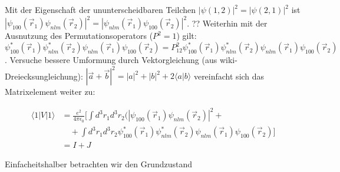 Mit der Eigenschaft der ununterscheidbaren Teilchen \(|\psi(1,2)|^2 = |\psi(2,1)|^2 \) ist \(|\psi_{100}(\vec r_1)\psi_{nlm}(\vec r_2)|^2 =|\psi_{nlm}(\vec r_1) \psi_{100}(\vec r_2)|^2 \). ?? Weiterhin mit der Ausnutzung des Permutationsoperators (\(P^2=1\)) gilt: \(\psi_{100}^*(\vec r_1)\psi_{nlm}^*(\vec r_2) \psi_{nlm}(\vec r_1) \psi_{100}(\vec r_2) = P_{12}^2  \psi_{100}^*(\vec r_1)\psi_{nlm}^*(\vec r_2) \psi_{nlm}(\vec r_1) \psi_{100}(\vec r_2)\). Versuche bessere Umformung durch Vektorgleichung (aus wiki-Dreiecksungleichung): \( |\vec a + \vec b|^2=|a|^2+|b|^2+2\langle a|b\rangle   \)  vereinfacht sich das Matrixelement weiter zu:

\begin{align}
\langle 1|V|1\rangle &= \frac{ e^2}{4\pi\epsilon_0 } [ \int d^3 r_1 d^3r_2 ( |\psi_{100}(\vec r_1)\psi_{nlm}(\vec r_2)|^2 +\\
&\quad + \int d^3 r_1 d^3r_2 \psi_{100}^*(\vec r_1)\psi_{nlm}^*(\vec r_2) \psi_{nlm}(\vec r_1) \psi_{100}(\vec r_2) ] \\
&= I+J
\end{align}



Einfacheitshalber betrachten wir den Grundzustand




 